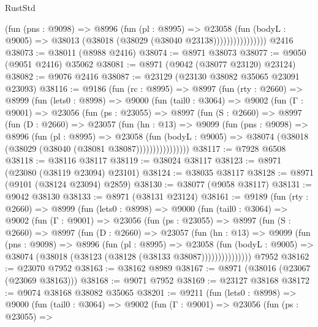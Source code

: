 \begin{lexlean}{RustStd}
\begin{coremodule}
                        (fun (pns : @9098) =>
                        @8996
                          (fun (pl : @8995) =>
                          @23058
                            (fun (bodyL : @9005) =>
                            @38013 (@38018 (@38029 (@38040 @23138))))))))))))))))
    @2416
@38073 := @38011 (@8988 @2416)
@38074 := @8971 @38073
@38077 := @9050 (@9051 @2416) @35062
@38081 := @8971 (@9042 (@38077 @23120) @23124)
@38082 := @9076 @2416
@38087 := @23129 (@23130 @38082 @35065 @23091 @23093)
@38116 := @9186
    (fun (rc : @8995) =>
    @8997
      (fun (rty : @2660) =>
      @8999
        (fun (lets0 : @8998) =>
        @9000
          (fun (tail0 : @3064) =>
          @9002
            (fun (Γ : @9001) =>
            @23056
              (fun (ps : @23055) =>
              @8997
                (fun (S : @2660) =>
                @8997
                  (fun (D : @2660) =>
                  @23057
                    (fun (hn : @13) =>
                    @9099
                      (fun (pns : @9098) =>
                      @8996
                        (fun (pl : @8995) =>
                        @23058
                          (fun (bodyL : @9005) =>
                          @38074 (@38018 (@38029 (@38040 (@38081 @38087))))))))))))))))
@38117 := @7928 @6508
@38118 := @38116 @38117
@38119 := @38024 @38117
@38123 := @8971 (@23080 (@38119 @23094) @23101)
@38124 := @38035 @38117
@38128 := @8971 (@9101 (@38124 @23094) @2859)
@38130 := @38077 (@9058 @38117)
@38131 := @9042 @38130
@38133 := @8971 (@38131 @23124)
@38161 := @9189
    (fun (rty : @2660) =>
    @8999
      (fun (lets0 : @8998) =>
      @9000
        (fun (tail0 : @3064) =>
        @9002
          (fun (Γ : @9001) =>
          @23056
            (fun (ps : @23055) =>
            @8997
              (fun (S : @2660) =>
              @8997
                (fun (D : @2660) =>
                @23057
                  (fun (hn : @13) =>
                  @9099
                    (fun (pns : @9098) =>
                    @8996
                      (fun (pl : @8995) =>
                      @23058
                        (fun (bodyL : @9005) =>
                        @38074 (@38018 (@38123 (@38128 (@38133 @38087)))))))))))))))
    @7952
@38162 := @23070 @7952
@38163 := @38162 @8989
@38167 := @8971 (@38016 (@23067 (@23069 @38163)))
@38168 := @9071 @7952
@38169 := @23127 @38168
@38172 := @9074 @38168 @38082 @35065
@38201 := @9211
    (fun (lets0 : @8998) =>
    @9000
      (fun (tail0 : @3064) =>
      @9002
        (fun (Γ : @9001) =>
        @23056
          (fun (ps : @23055) =>

\end{coremodule}
\end{lexlean}
